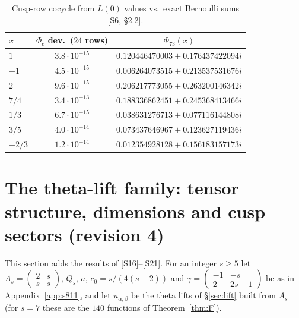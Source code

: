 \documentclass[11pt]{article}
\theoremstyle{definition}
\theoremstyle{plain}
\newcommand{\src}[1]{\textup{[S#1]}}
\begin{document}
\begin{table}[ht]\centering\small
\begin{tabular}{lcc}\toprule
$x$ & $\Phi_c$ dev.\ ($24$ rows) & $\Phi_{73}(x)$\\\midrule
$1$ & $3.8\cdot10^{-15}$ & $0.120446470003+0.176437422094i$\\
$-1$ & $4.5\cdot10^{-15}$ & $0.006264073515+0.213537531676i$\\
$2$ & $9.6\cdot10^{-15}$ & $0.206217773055+0.263200146342i$\\
$7/4$ & $3.4\cdot10^{-13}$ & $0.188336862451+0.245368413466i$\\
$1/3$ & $6.7\cdot10^{-15}$ & $0.038631276713+0.077116144808i$\\
$3/5$ & $4.0\cdot10^{-14}$ & $0.073437646967+0.123627119436i$\\
$-2/3$ & $1.2\cdot10^{-14}$ & $0.012354928128+0.156183157173i$\\\bottomrule
\end{tabular}
\caption{Cusp-row cocycle from $L(0)$ values vs.\ exact Bernoulli sums \src{6, \S2.2}.}\label{tab:phi73}
\end{table}

\section{The theta-lift family: tensor structure, dimensions and cusp sectors (revision 4)}\label{sec:family}
This section adds the results of \src{16}--\src{21}. For an integer $s\ge5$ let $A_s=\begin{pmatrix}2&s\\s&s\end{pmatrix}$, $Q_s$, $a$, $c_0=s/(4(s-2))$ and
$\gamma=\begin{pmatrix}-1&-s\\2&2s-1\end{pmatrix}$ be as in Appendix~\ref{app:s811}, and let $u_{\alpha,\beta}$ be the theta lifts of \S\ref{sec:lift} built from $A_s$
(for $s=7$ these are the $140$ functions of Theorem~\ref{thm:F}).
\end{document}

